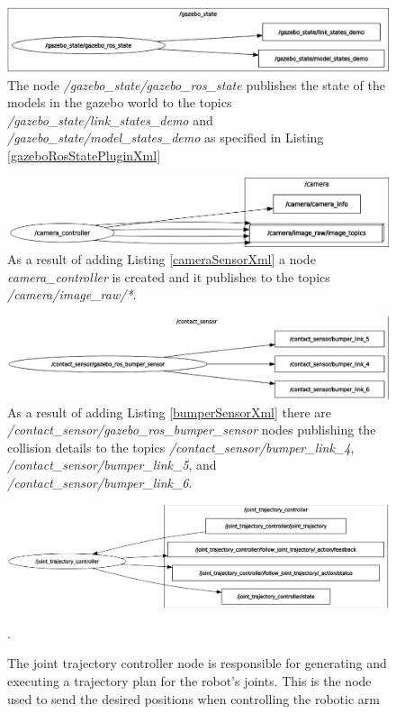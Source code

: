 \documentclass[12pt,oneside]{article}
\begin{document}
\begin{figure}[H]
\centering
\includegraphics[width=0.7\linewidth]{rosgraph01}
\caption{The node \textit{/gazebo\_state/gazebo\_ros\_state} publishes the state of the models in the gazebo world to the topics \textit{/gazebo\_state/link\_states\_demo} and \textit{/gazebo\_state/model\_states\_demo} as specified in Listing \ref{gazeboRosStatePluginXml}}
\label{fig:rosgraph01}
\end{figure}

\begin{figure}[H]
\centering
\includegraphics[width=0.7\linewidth]{rosgraph02}
\caption{As a result of adding Listing \ref{cameraSensorXml} a node \textit{camera\_controller} is created and it publishes to the topics \textit{/camera/image\_raw/*}.}
\label{fig:rosgraph02}
\end{figure}

\begin{figure}[H]
\centering
\includegraphics[width=0.7\linewidth]{rosgraph03}
\caption{As a result of adding Listing \ref{bumperSensorXml} there are \textit{/contact\_sensor/gazebo\_ros\_bumper\_sensor} nodes publishing the collision details to the topics \textit{/contact\_sensor/bumper\_link\_4}, \textit{/contact\_sensor/bumper\_link\_5}, and\textit{ /contact\_sensor/bumper\_link\_6}. }
\label{fig:rosgraph03}
\end{figure}

\begin{figure}[H]
\centering
\includegraphics[width=0.7\linewidth]{rosgraph04}
\caption{The joint trajectory controller node is responsible for generating and executing a trajectory plan for the robot's joints. This is the node used to send the desired positions when controlling the robotic arm}.
\label{fig:rosgraph04}
\end{figure}
\end{document}
